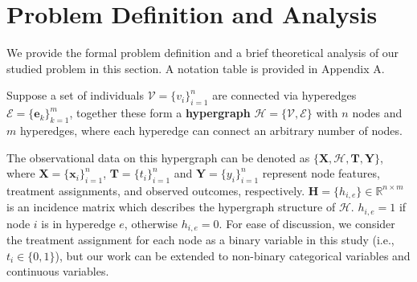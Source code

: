 \vspace{-2mm}
\section{Problem Definition and Analysis}
We provide the formal problem definition and a brief theoretical analysis of our studied problem in this section. A notation table is provided in Appendix A.
\begin{definition}
Suppose a set of individuals $\mathcal{V}=\{v_i\}_{i=1}^n$ are connected via hyperedges $\mathcal{E}=\{\mathbf{e}_k\}_{k=1}^m$, together these form a \textbf{hypergraph} $\mathcal{H}=\{\mathcal{V},\mathcal{E}\}$ with $n$ nodes and $m$ hyperedges, where each hyperedge can connect an arbitrary number of nodes. 
\end{definition}
The observational data on this hypergraph can be denoted as $\{\mathbf{X}, \mathcal{H}, \mathbf{T}, \mathbf{Y}\}$, where $\mathbf{X} =\{\mathbf{x}_i\}_{i=1}^n$, $\mathbf{T}=\{t_i\}_{i=1}^n$ and $\mathbf{Y}=\{y_i\}_{i=1}^n$ represent node features, treatment assignments, and observed outcomes, respectively. $\mathbf{H}=\{h_{i,e}\}\in\mathbb{R}^{n\times m}$ is an incidence matrix which describes the hypergraph structure of $\mathcal{H}$. $h_{i,e}=1$ if node $i$ is in hyperedge $e$, otherwise $h_{i,e}=0$. For ease of discussion, we consider the treatment assignment for each node as a binary variable in this study (i.e., $t_i\in\{0,1\}$), but our work can be extended to non-binary categorical variables and continuous variables.

